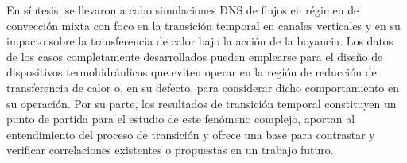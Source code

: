 %
%
%
%
%

En síntesis, se llevaron a cabo simulaciones DNS de flujos en régimen de convección mixta con foco en la transición temporal en canales verticales y en su impacto sobre la \linebreak transferencia de calor bajo la acción de la boyancia. Los datos de los casos completamente \linebreak desarrollados pueden emplearse para el diseño de dispositivos termohidráulicos que eviten \linebreak operar en la región de reducción de transferencia de calor o, en su defecto, para considerar \linebreak dicho  comportamiento en su operación. Por su parte, los resultados de transición temporal constituyen un punto de partida para el estudio de este fenómeno complejo, aportan al entendimiento del proceso de transición y ofrece una base para contrastar y verificar correlaciones existentes o propuestas en un trabajo futuro.
